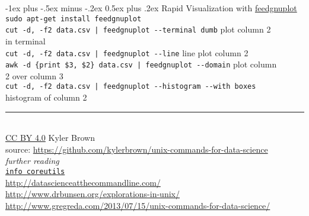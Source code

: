 \documentclass[10pt]{article}
\makeatletter
\renewcommand{\section}{\@startsection{section}{1}{0mm}%
                                {-1ex plus -.5ex minus -.2ex}%
                                {0.5ex plus .2ex}%
                                {\normalfont\large\bfseries}}
\newcommand{\q}{\textquotesingle } %
\makeatother
\begin{document}
\begin{multicols}{2}
\section{Rapid Visualization with \href{https://github.com/dkogan/feedgnuplot}{feedgnuplot}}
{\tt sudo apt-get install feedgnuplot}\\
{\tt cut -d, -f2  data.csv | feedgnuplot -{}-terminal \q dumb\q} \hfill plot column 2\\
	\hfill in terminal\\
{\tt  cut -d, -f2  data.csv | feedgnuplot -{}-line} \hfill line plot column 2\\
{\tt awk -d \q\{print \$3, \$2\}\q\  data.csv | feedgnuplot -{}-domain} \hfill plot column\\
	\hfill 2 over column 3\\
{\tt cut -d, -f2   data.csv | feedgnuplot -{}-histogram -{}-with boxes}\\
	\hfill histogram of column 2\\

\rule{0.3\linewidth}{0.25pt}\\
\scriptsize
\href{https://creativecommons.org/licenses/by/4.0/}{CC BY 4.0} Kyler Brown\\
source: \url{https://github.com/kylerbrown/unix-commands-for-data-science}\\

\textit{further reading}\\
\href{https://www.gnu.org/software/coreutils/manual/coreutils.html}{{\tt info coreutils}}\\
\url{http://datascienceatthecommandline.com/}\\
\url{http://www.drbunsen.org/explorations-in-unix/}\\
\url{http://www.gregreda.com/2013/07/15/unix-commands-for-data-science/}\\


\end{multicols}
\end{document}
